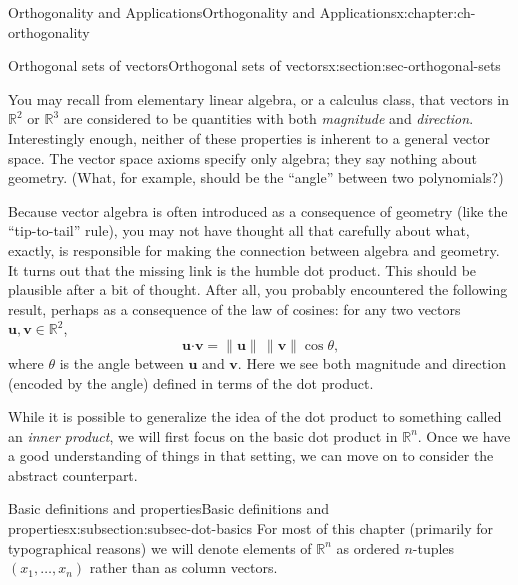 \documentclass[oneside,10pt,]{book}
\numberwithin{equation}{section}
\newcommand{\R}{\mathbb{R}}
\newcommand{\dotp}{\!\boldsymbol{\cdot}\!}
\newcommand{\len}[1]{\lVert #1\rVert}
\newcommand{\uu}{\mathbf{u}}
\newcommand{\vv}{\mathbf{v}}
\begin{document}
\begin{chapterptx}{Orthogonality and Applications}{}{Orthogonality and Applications}{}{}{x:chapter:ch-orthogonality}
%
%
\typeout{************************************************}
\typeout{************************************************}
%
\begin{sectionptx}{Orthogonal sets of vectors}{}{Orthogonal sets of vectors}{}{}{x:section:sec-orthogonal-sets}
\begin{introduction}{}%
You may recall from elementary linear algebra, or a calculus class, that vectors in \(\R^2\) or \(\R^3\) are considered to be quantities with both \emph{magnitude} and \emph{direction}. Interestingly enough, neither of these properties is inherent to a general vector space. The vector space axioms specify only algebra; they say nothing about geometry. (What, for example, should be the ``angle'' between two polynomials?)%
\par
Because vector algebra is often introduced as a consequence of geometry (like the ``tip-to-tail'' rule), you may not have thought all that carefully about what, exactly, is responsible for making the connection between algebra and geometry. It turns out that the missing link is the humble dot product. This should be plausible after a bit of thought. After all, you probably encountered the following result, perhaps as a consequence of the law of cosines: for any two vectors \(\uu,\vv\in\R^2\),%
\begin{equation*}
\uu\dotp\vv = \len{\uu}\,\len{\vv}\cos\theta\text{,}
\end{equation*}
where \(\theta\) is the angle between \(\uu\) and \(\vv\). Here we see both magnitude and direction (encoded by the angle) defined in terms of the dot product.%
\par
While it is possible to generalize the idea of the dot product to something called an \emph{inner product}, we will first focus on the basic dot product in \(\R^n\). Once we have a good understanding of things in that setting, we can move on to consider the abstract counterpart.%
\end{introduction}%
%
%
\typeout{************************************************}
\typeout{************************************************}
%
\begin{subsectionptx}{Basic definitions and properties}{}{Basic definitions and properties}{}{}{x:subsection:subsec-dot-basics}
For most of this chapter (primarily for typographical reasons) we will denote elements of \(\R^n\) as ordered \(n\)-tuples \((x_1,\ldots, x_n)\) rather than as column vectors.%

\end{subsectionptx}
\end{sectionptx}
\end{chapterptx}
\end{document}
